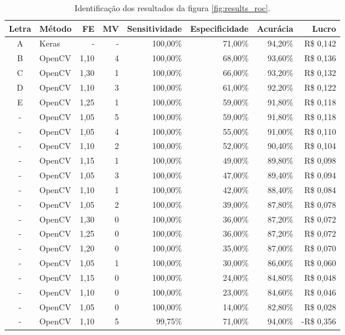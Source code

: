  \begin{table}[htbp]
     \caption{Identificação dos resultados da figura \ref{fig:results_roc}.}
     \label{tab:results_identify}
     \centering
     \begin{tabular}{clrrrrrr}
     Letra & Método & FE & MV & Sensitividade & Especificidade & Acurácia & Lucro \\
      \midrule
      A & Keras  & - & - & 100,00\% & 71,00\% & 94,20\% & R\$ 0,142 \\
      B & OpenCV & 1,10 & 4 & 100,00\% & 68,00\% & 93,60\% & R\$ 0,136 \\
      C & OpenCV & 1,30 & 1 & 100,00\% & 66,00\% & 93,20\% & R\$ 0,132 \\
      D & OpenCV & 1,10 & 3 & 100,00\% & 61,00\% & 92,20\% & R\$ 0,122 \\
      E & OpenCV & 1,25 & 1 & 100,00\% & 59,00\% & 91,80\% & R\$ 0,118 \\
      - & OpenCV & 1,05 & 5 & 100,00\% & 59,00\% & 91,80\% & R\$ 0,118 \\
      - & OpenCV & 1,05 & 4 & 100,00\% & 55,00\% & 91,00\% & R\$ 0,110 \\
      - & OpenCV & 1,10 & 2 & 100,00\% & 52,00\% & 90,40\% & R\$ 0,104 \\
      - & OpenCV & 1,15 & 1 & 100,00\% & 49,00\% & 89,80\% & R\$ 0,098 \\
      - & OpenCV & 1,05 & 3 & 100,00\% & 47,00\% & 89,40\% & R\$ 0,094 \\
      - & OpenCV & 1,10 & 1 & 100,00\% & 42,00\% & 88,40\% & R\$ 0,084 \\
      - & OpenCV & 1,05 & 2 & 100,00\% & 39,00\% & 87,80\% & R\$ 0,078 \\
      - & OpenCV & 1,30 & 0 & 100,00\% & 36,00\% & 87,20\% & R\$ 0,072 \\
      - & OpenCV & 1,25 & 0 & 100,00\% & 36,00\% & 87,20\% & R\$ 0,072 \\
      - & OpenCV & 1,20 & 0 & 100,00\% & 35,00\% & 87,00\% & R\$ 0,070 \\
      - & OpenCV & 1,05 & 1 & 100,00\% & 30,00\% & 86,00\% & R\$ 0,060 \\
      - & OpenCV & 1,15 & 0 & 100,00\% & 24,00\% & 84,80\% & R\$ 0,048 \\
      - & OpenCV & 1,10 & 0 & 100,00\% & 23,00\% & 84,60\% & R\$ 0,046 \\
      - & OpenCV & 1,05 & 0 & 100,00\% & 14,00\% & 82,80\% & R\$ 0,028 \\
      - & OpenCV & 1,10 & 5 & 99,75\% & 71,00\% & 94,00\% & -R\$ 0,356 \\

\end{tabular}
\end{table}
